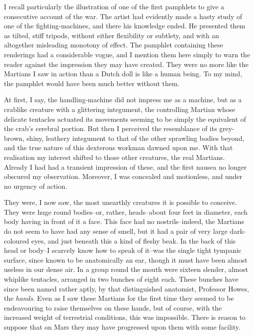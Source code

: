 I recall particularly the illustration of one of the first
pamphlets to give a consecutive account of the war. The artist had
evidently made a hasty study of one of the fighting-machines, and
there his knowledge ended. He presented them as tilted, stiff
tripods, without either flexibility or subtlety, and with an
altogether misleading monotony of effect. The pamphlet containing
these renderings had a considerable vogue, and I mention them here
simply to warn the reader against the impression they may have
created. They were no more like the Martians I saw in action than a
Dutch doll is like a human being. To my mind, the pamphlet would
have been much better without them.

At first, I say, the handling-machine did not impress me as a
machine, but as a crablike creature with a glittering integument,
the controlling Martian whose delicate tentacles actuated its
movements seeming to be simply the equivalent of the crab's
cerebral portion. But then I perceived the resemblance of its
grey-brown, shiny, leathery integument to that of the other
sprawling bodies beyond, and the true nature of this dexterous
workman dawned upon me. With that realisation my interest shifted
to those other creatures, the real Martians. Already I had had a
transient impression of these, and the first nausea no longer
obscured my observation. Moreover, I was concealed and motionless,
and under no urgency of action.

They were, I now saw, the most unearthly creatures it is possible
to conceive. They were huge round bodies--or, rather, heads--about
four feet in diameter, each body having in front of it a face. This
face had no nostrils--indeed, the Martians do not seem to have had
any sense of smell, but it had a pair of very large dark-coloured
eyes, and just beneath this a kind of fleshy beak. In the back of
this head or body--I scarcely know how to speak of it--was the
single tight tympanic surface, since known to be anatomically an
ear, though it must have been almost useless in our dense air. In a
group round the mouth were sixteen slender, almost whiplike
tentacles, arranged in two bunches of eight each. These bunches
have since been named rather aptly, by that distinguished
anatomist, Professor Howes, the \emph{hands}. Even as I saw these
Martians for the first time they seemed to be endeavouring to raise
themselves on these hands, but of course, with the increased weight
of terrestrial conditions, this was impossible. There is reason to
suppose that on Mars they may have progressed upon them with some
facility.

